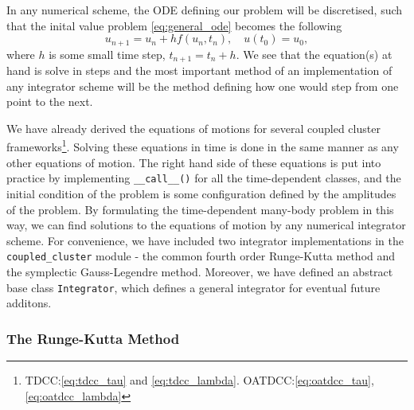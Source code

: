     In any numerical scheme, the ODE defining our problem will be discretised, such 
    that the inital value problem \autoref{eq:general_ode} becomes the following 
    \begin{equation}
        u_{n+1} = u_n + hf(u_n, t_n), \quad u(t_0) = u_0,
    \end{equation}
    where $h$ is some small time step, $t_{n+1} = t_n + h$. We see that the equation(s) at 
    hand is solve in steps and the most important method of an implementation of any integrator 
    scheme will be the method defining how one would step from one point to the next. 
 
    We have already derived the equations of motions for several coupled 
    cluster frameworks\footnote{TDCC:\autoref{eq:tdcc_tau} and
    \autoref{eq:tdcc_lambda}.
    OATDCC:\autoref{eq:oatdcc_tau}, \autoref{eq:oatdcc_lambda}}. Solving these equations 
    in time is done in the same manner as any other equations of motion. The right hand 
    side of these equations is put into practice by implementing \lstinline{__call__()} for 
    all the time-dependent classes, and the initial condition of the problem is some 
    configuration defined by the amplitudes of the problem. By formulating the time-dependent
    many-body problem in this way, we can find solutions to the equations of motion by 
    any numerical integrator scheme. For convenience, we have included two integrator 
    implementations in the \lstinline{coupled_cluster} module - the common fourth order 
    Runge-Kutta method and the symplectic Gauss-Legendre method. Moreover, we have defined an 
    abstract base class \lstinline{Integrator}, which defines a general integrator for 
    eventual future additons.

    

    \subsubsection{The Runge-Kutta Method}

